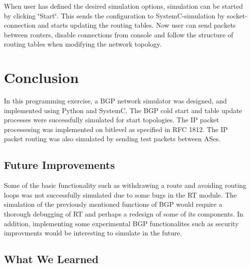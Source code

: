 When user has defined the desired simulation options, simulation can be started by clicking \char`\"{}\-Start\char`\"{}. This sends the configuration to System\-C-\/simulation by socket-\/connection and starts updating the routing tables. Now user can send packets between routers, disable connections from console and follow the structure of routing tables when modifying the network topology. \hypertarget{index_s_conclusion}{}\section{Conclusion}\label{index_s_conclusion}
In this programming exercise, a B\-G\-P network simulator was designed, and implemented using Python and System\-C. The B\-G\-P cold start and table update processes were successfully simulated for start topologies. The I\-P packet processesing was implemented on bitlevel as specified in R\-F\-C 1812. The I\-P packet routing was also simulated by sending test packets between A\-Ses. \hypertarget{index_sub_futureImprovements}{}\subsection{Future Improvements}\label{index_sub_futureImprovements}
Some of the basic functionality such as withdrawing a route and avoiding routing loops was not successfully simulated due to some bugs in the R\-T module. The simulation of the previously mentioned functions of B\-G\-P would require a thorough debugging of R\-T and perhaps a redesign of some of its components. In addition, implementing some experimental B\-G\-P functionalites such as security improvments would be interesting to simulate in the future. \hypertarget{index_sub_whatwelearned}{}\subsection{What We Learned}\label{index_sub_whatwelearned}
